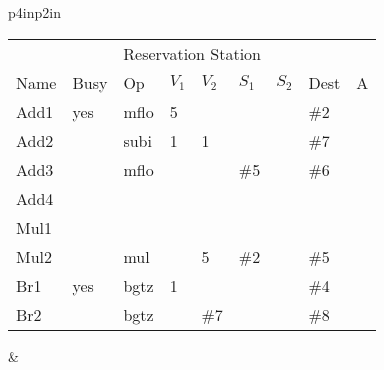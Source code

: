 \begin{tabular}{p{4in}p{2in}}
\noindent
\begin{tabular}{lllllllll}
\multicolumn{9}{c}{Reservation Station} \\
Name & Busy & Op   & $V_1$ & $V_2$ & $S_1$ & $S_2$ & Dest & A \\ \hline
Add1 & yes  & mflo & 5     &       &       &       & \#2  &   \\
Add2 &      & subi & 1     & 1     &       &       & \#7     &   \\
Add3 &      & mflo &       &       & \#5   &       & \#6  &   \\
Add4 &      &      &       &       &       &       &      &   \\ \hline
Mul1 &      &      &       &       &       &       &      &   \\
Mul2 &      & mul  &       & 5     & \#2   &       & \#5  &   \\ \hline
Br1  & yes  & bgtz & 1     &       &       &       & \#4  &   \\
Br2  &      & bgtz &       & \#7   &       &       & \#8  &   \\
\end{tabular} &  \\
\end{tabular}






